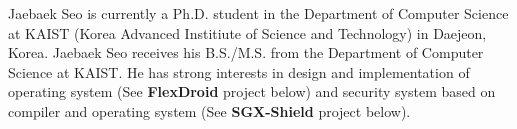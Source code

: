 

\begin{cvparagraph}

    Jaebaek Seo is currently a Ph.D. student in the Department of Computer
    Science at KAIST (Korea Advanced Institiute of Science and Technology)
    in Daejeon, Korea.
    Jaebaek Seo receives his B.S./M.S. from the Department of Computer
    Science at KAIST.
    He has strong interests in design and implementation of operating
    system (See \textbf{FlexDroid} project below) and security system
    based on compiler and operating system (See \textbf{SGX-Shield}
    project below).
\end{cvparagraph}
